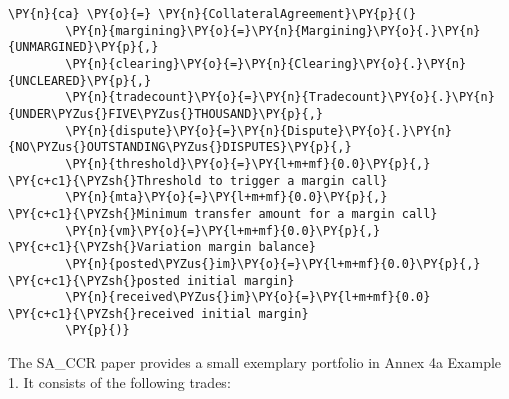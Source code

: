    \begin{tcolorbox}[breakable, size=fbox, boxrule=1pt, pad at break*=1mm,colback=cellbackground, colframe=cellborder]
\begin{Verbatim}[commandchars=\\\{\}]
\PY{n}{ca} \PY{o}{=} \PY{n}{CollateralAgreement}\PY{p}{(}
        \PY{n}{margining}\PY{o}{=}\PY{n}{Margining}\PY{o}{.}\PY{n}{UNMARGINED}\PY{p}{,}
        \PY{n}{clearing}\PY{o}{=}\PY{n}{Clearing}\PY{o}{.}\PY{n}{UNCLEARED}\PY{p}{,}
        \PY{n}{tradecount}\PY{o}{=}\PY{n}{Tradecount}\PY{o}{.}\PY{n}{UNDER\PYZus{}FIVE\PYZus{}THOUSAND}\PY{p}{,}
        \PY{n}{dispute}\PY{o}{=}\PY{n}{Dispute}\PY{o}{.}\PY{n}{NO\PYZus{}OUTSTANDING\PYZus{}DISPUTES}\PY{p}{,}
        \PY{n}{threshold}\PY{o}{=}\PY{l+m+mf}{0.0}\PY{p}{,}      \PY{c+c1}{\PYZsh{}Threshold to trigger a margin call}
        \PY{n}{mta}\PY{o}{=}\PY{l+m+mf}{0.0}\PY{p}{,}            \PY{c+c1}{\PYZsh{}Minimum transfer amount for a margin call}
        \PY{n}{vm}\PY{o}{=}\PY{l+m+mf}{0.0}\PY{p}{,}             \PY{c+c1}{\PYZsh{}Variation margin balance}
        \PY{n}{posted\PYZus{}im}\PY{o}{=}\PY{l+m+mf}{0.0}\PY{p}{,}      \PY{c+c1}{\PYZsh{}posted initial margin}
        \PY{n}{received\PYZus{}im}\PY{o}{=}\PY{l+m+mf}{0.0}     \PY{c+c1}{\PYZsh{}received initial margin}
        \PY{p}{)}
\end{Verbatim}
\end{tcolorbox}

    The SA\_CCR paper provides a small exemplary portfolio in Annex 4a
Example 1. It consists of the following trades:

